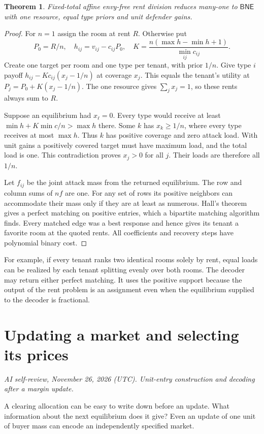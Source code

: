 \documentclass[11pt,oneside,openany,notitlepage]{report}
\newtheorem{theorem}{Theorem}[chapter]
\newcommand{\BNE}{\mathsf{BNE}}
\newcommand{\reviewdate}{November 26, 2026 (UTC)}
\newcommand{\reviewmark}[1]{\par\nopagebreak[4]\noindent
  {\footnotesize\itshape AI self-review, \reviewdate. #1\par}\nobreak\smallskip}
\begin{document}
\begin{theorem}\label{thm:rent}
Fixed-total affine envy-free rent division reduces many-one to \(\BNE\)
with one resource, equal type priors and unit defender gains.
\end{theorem}
\begin{proof}
For \(n=1\) assign the room at rent \(R\). Otherwise put
\[
 P_0=R/n,\quad h_{ij}=v_{ij}-c_{ij}P_0,\quad
 K=\frac{n(\max h-\min h+1)}{\min_{ij} c_{ij}} .
\]
Create one target per room and one type per tenant, with prior \(1/n\).
Give type \(i\) payoff \(h_{ij}-Kc_{ij}(x_j-1/n)\) at coverage \(x_j\).
This equals the tenant's utility at \(P_j=P_0+K(x_j-1/n)\). The one
resource gives \(\sum_j x_j=1\), so these rents always sum to \(R\).

Suppose an equilibrium had \(x_\ell=0\). Every type would receive at
least \(\min h+K\min c/n>\max h\) there. Some \(k\) has \(x_k\ge1/n\),
where every type receives at most \(\max h\). Thus \(k\) has positive
coverage and zero attack load. With unit gains a positively covered
target must have maximum load, and the total load is one. This
contradiction proves \(x_j>0\) for all \(j\). Their loads are therefore
all \(1/n\).

Let \(f_{ij}\) be the joint attack mass from the returned equilibrium.
The row and column sums of \(nf\) are one. For any set of rows its
positive neighbors can accommodate their mass only if they are at least
as numerous. Hall's theorem gives a perfect matching on positive entries,
which a bipartite matching algorithm finds. Every matched edge was a best
response and hence gives its tenant a favorite room at the quoted rents.
All coefficients and recovery steps have polynomial binary cost.
\end{proof}

For example, if every tenant ranks two identical rooms solely by rent,
equal loads can be realized by each tenant splitting evenly over both
rooms. The decoder may return either perfect matching. It uses the
positive support because the output of the rent problem is an assignment
even when the equilibrium supplied to the decoder is fractional.

\chapter{Updating a market and selecting its prices}\label{sec:update}
\reviewmark{Unit-entry construction and decoding after a margin update.}

A clearing allocation can be easy to write down before an update. What
information about the next equilibrium does it give? Even an update of one
unit of buyer mass can encode an independently specified market.
\end{document}
